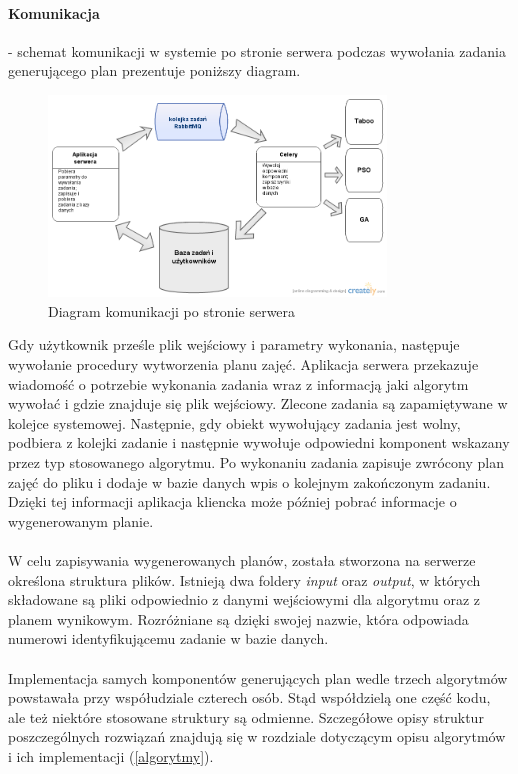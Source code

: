 \paragraph{Komunikacja} - schemat komunikacji w systemie po stronie serwera podczas wywołania zadania generującego plan prezentuje poniższy diagram.
\begin{figure}[H]
  \caption{Diagram komunikacji po stronie serwera}
  \centering
    \includegraphics[width=0.8\textwidth]{img/SystemCommunication.png}
\end{figure}
Gdy użytkownik prześle plik wejściowy i parametry wykonania, następuje wywołanie procedury wytworzenia planu zajęć. Aplikacja serwera przekazuje wiadomość o potrzebie wykonania zadania wraz z informacją jaki algorytm wywołać i gdzie znajduje się plik wejściowy. Zlecone zadania są zapamiętywane w kolejce systemowej. Następnie, gdy obiekt wywołujący zadania jest wolny, podbiera z kolejki zadanie i następnie wywołuje odpowiedni komponent wskazany przez typ stosowanego algorytmu. Po wykonaniu zadania zapisuje zwrócony plan zajęć do pliku i dodaje w bazie danych wpis o kolejnym zakończonym zadaniu. Dzięki tej informacji aplikacja kliencka może później pobrać informacje o wygenerowanym planie.
\paragraph{}W celu zapisywania wygenerowanych planów, została stworzona  na serwerze określona struktura plików. Istnieją dwa foldery \emph{input} oraz \emph{output}, w których składowane są pliki odpowiednio z danymi wejściowymi dla algorytmu oraz z planem wynikowym. Rozróżniane są dzięki swojej nazwie, która odpowiada numerowi identyfikującemu zadanie w bazie danych.
\paragraph{} Implementacja samych komponentów generujących plan wedle trzech algorytmów powstawała przy współudziale czterech osób. Stąd współdzielą one część kodu, ale też niektóre stosowane struktury są odmienne. Szczegółowe opisy struktur poszczególnych rozwiązań znajdują się w rozdziale dotyczącym opisu algorytmów i ich implementacji (\ref{algorytmy}).